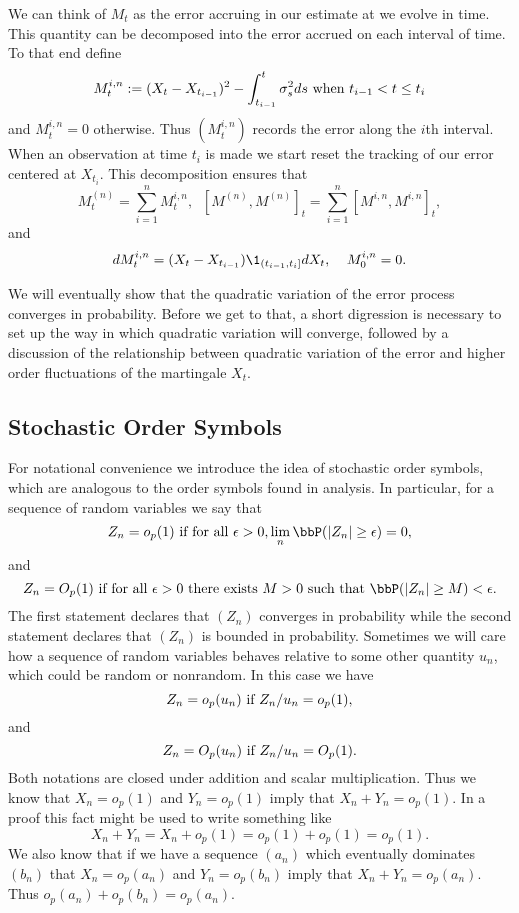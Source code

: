\documentclass{report}
\begin{document}
We can think of $M_t$ as the error accruing in our estimate at we
evolve in time.  This quantity can be decomposed into the error
accrued on each interval of time.  To that end define
\[
M^{i,n}_t : = (X_{t} - X_{t_{i-1}})^2 - \int_{t_{i-1}}^t \sigma_s^2 ds
\textmd{ when } t_{i-1} < t \leq t_{i}
\]
and $M^{i,n}_t = 0$ otherwise.  Thus $(M^{i,n}_t)$ records the error
along the $i$th interval.  When an observation at time $t_i$ is made
we start reset the tracking of our error centered at $X_{t_i}$.  This
decomposition ensures that
\[
M^{(n)}_t = \sum_{i=1}^n M^{i,n}_t,  \;\; [M^{(n)},M^{(n)}]_t =
\sum_{i=1}^n [M^{i,n} ,M^{i,n}]_t, 
\]
and
\[
d M^{i,n}_t = (X_t - X_{t_{i-1}}) \1_{(t_{i-1},t_i]} d X_t, \;\;\;\;
M^{i,n}_0 = 0.
\]

We will eventually show that the quadratic variation of the error
process converges in probability.  Before we get to that, a short
digression is necessary to set up the way in which quadratic variation
will converge, followed by a discussion of the relationship between
quadratic variation of the error and higher order fluctuations of the
martingale $X_t$.


\subsection{Stochastic Order Symbols}

For notational convenience we introduce the idea of stochastic order
symbols, which are analogous to the order symbols found in analysis. 
In particular, for a sequence of random variables we say that
\[
Z_n = o_p(1) \textmd{ if for all } \epsilon > 0, \lim_n \bbP(|Z_n|
\geq \epsilon) = 0,
\]
and
\[
Z_n = O_p(1) \textmd{ if for all } \epsilon > 0 \textmd{ there exists
} M > 0 \textmd{ such that } \bbP(|Z_n| \geq M) < \epsilon.
\]
The first statement declares that $(Z_n)$ converges in probability
while the second statement declares that $(Z_n)$ is bounded in
probability.  Sometimes we will care how a sequence of random
variables behaves relative to some other quantity $u_n$, which could
be random or nonrandom.  In this case we have
\[
Z_n = o_p(u_n) \textmd{ if } Z_n / u_n = o_p(1),
\]
and
\[
Z_n = O_p(u_n) \textmd{ if } Z_n / u_n = O_p(1).
\]
Both notations are closed under addition and scalar multiplication. 
Thus we know that $X_n = o_p(1)$ and $Y_n = o_p(1)$ imply that $X_n +
Y_n = o_p(1)$.  In a proof this fact might be used to write something
like 
\[
X_n + Y_n = X_n + o_p(1) = o_p(1) + o_p(1) = o_p(1).
\]
We also know that if we have a sequence $(a_n)$ which eventually
dominates $(b_n)$ that $X_n = o_p(a_n)$ and $Y_n = o_p(b_n)$ imply
that $X_n + Y_n = o_p(a_n)$.  Thus $o_p(a_n) + o_p(b_n) = o_p(a_n)$. 
\end{document}
